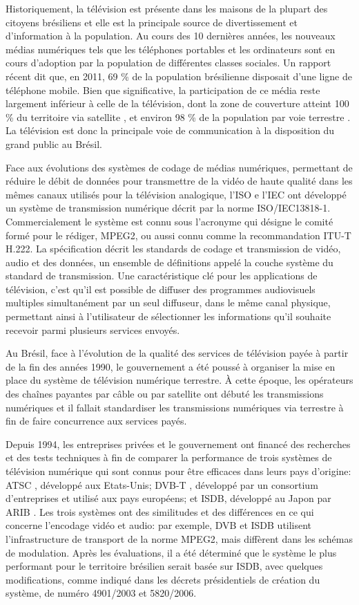\documentclass[12pt,a4paper]{article}
\begin{document}
Historiquement, la télévision est présente dans les maisons de la plupart des citoyens brésiliens et elle est la principale source de divertissement et d'information à la population. Au cours des 10 dernières années, les nouveaux médias numériques tels que les téléphones portables et les ordinateurs sont en cours d'adoption par la population de différentes classes sociales. Un rapport récent \cite{pnad2011} dit que, en 2011, 69 \% de la population brésilienne disposait d'une ligne de téléphone mobile. Bien que significative, la participation de ce média reste largement inférieur à celle de la télévision, dont la zone de couverture atteint 100 \% du territoire via satellite \cite{StarOne}, et environ 98 \% de la population par voie terrestre \cite{globo}. La télévision est donc la principale voie de communication à la disposition du grand public au Brésil.

Face aux évolutions des systèmes de codage de médias numériques, permettant de réduire le débit de données pour transmettre de la vidéo de haute qualité dans les mêmes canaux utilisés pour la télévision analogique, l'ISO e l'IEC ont développé un système de transmission numérique décrit par la norme ISO/IEC13818-1. Commercialement le système est connu sous l'acronyme qui désigne le comité formé pour le rédiger, MPEG2, ou aussi connu comme la recommandation ITU-T H.222. La spécification décrit les standards de codage et transmission de vidéo, audio et des données, un ensemble de définitions appelé la couche système du standard de transmission. Une caractéristique clé pour les applications de télévision, c'est qu'il est possible de diffuser des programmes audiovisuels multiples simultanément par un seul diffuseur, dans le même canal physique, permettant ainsi à l'utilisateur de sélectionner les informations qu'il souhaite recevoir parmi plusieurs services envoyés.

Au Brésil, face à l'évolution de la qualité des services de télévision payée à partir de la fin des années 1990, le gouvernement a été poussé à organiser la mise en place du système de télévision numérique terrestre. À cette époque, les opérateurs des chaînes payantes par câble ou par satellite ont débuté les transmissions numériques et il fallait standardiser les transmissions numériques via terrestre à fin de faire concurrence aux services payés.

Depuis 1994, les entreprises privées et le gouvernement ont financé des recherches et des tests techniques à fin de comparer la performance de trois systèmes de télévision numérique qui sont connus pour être efficaces dans leurs pays d'origine: ATSC \cite{ATSC}, développé aux Etats-Unis; DVB-T \cite{DVB}, développé par un consortium d'entreprises et utilisé aux pays européens; et ISDB, développé au Japon par ARIB \cite{ARIB}. Les trois systèmes ont des similitudes et des différences en ce qui concerne l'encodage vidéo et audio: par exemple, DVB et ISDB utilisent l'infrastructure de transport de la norme MPEG2, mais diffèrent dans les schémas de modulation. Après les évaluations, il a été déterminé que le système le plus performant pour le territoire brésilien serait basée sur ISDB, avec quelques modifications, comme indiqué dans les décrets présidentiels de création du système, de numéro 4901/2003 et  5820/2006.
\end{document}
